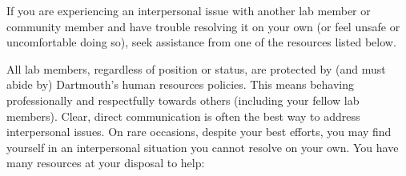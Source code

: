 \documentclass{tufte-book} %
\begin{document}
\label{sec:interpersonal}

\noindent If you are experiencing an interpersonal issue with another
lab member or community member and have trouble resolving it on your
own (or feel unsafe or uncomfortable doing so), seek assistance from
one of the resources listed below.

All lab members, regardless of position or status, are protected by
(and must abide by) Dartmouth's human resources policies.  This means
behaving professionally and respectfully towards others (including
your fellow lab members).  Clear, direct communication is often the
best way to address interpersonal issues.  On rare occasions, despite
your best efforts, you may find yourself in an interpersonal situation
you cannot resolve on your own.  You have many resources at your
disposal to help:
\end{document}
